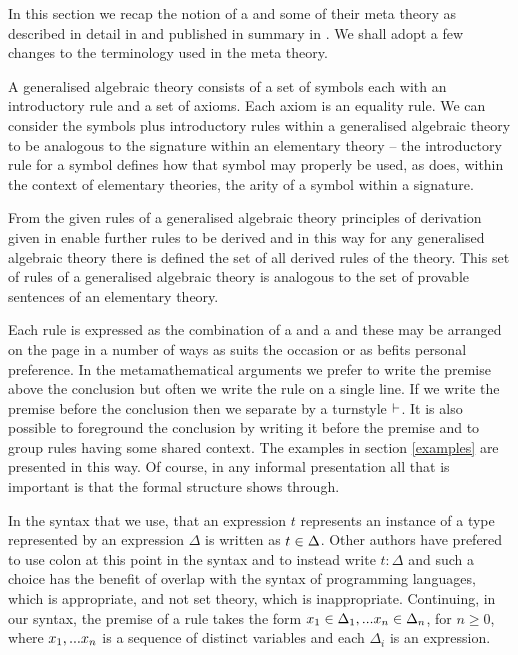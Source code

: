\label{generalisedalgrbraictheories}


In this section we recap the notion of a  and some of their meta theory 
as described in detail in \cite{Cartmell78}  and published in summary in \cite{Cartmell86}.
We shall adopt a few changes to the  terminology used in the meta theory.


A generalised algebraic theory consists of a set of symbols each with an introductory rule and a set of axioms. 
Each axiom is an equality rule. We can consider the symbols plus introductory rules within a generalised algebraic theory to be analogous to the signature within an elementary theory --
the introductory rule for a symbol defines how that symbol may properly be used, as does, within the context of elementary theories, the arity of a symbol within a signature.


From the given rules of a generalised algebraic theory  principles of derivation given in \cite{Cartmell86} enable further rules
to be derived and in this way for any generalised algebraic theory there is defined the set of all derived rules of the theory. 
This set of rules of a generalised algebraic theory is analogous to the set of provable sentences of an elementary theory.
  
Each rule is expressed as the combination of a   and a  and these may be arranged on the page in a number of ways as suits
the occasion or as befits personal preference. In the metamathematical arguments we prefer to write the premise above the conclusion 
 but often we write the rule on a single line. If we write the premise before the conclusion then we separate by a turnstyle $\vdash$. It is also possible to foreground the conclusion by writing it before the premise and to group rules having some shared context. The 
examples in section \ref{examples} are presented in this way.
Of course, in any informal presentation all that is important is that the formal structure shows through.  

In the syntax that we use,  that an expression $t$ represents an instance of a type represented by an expression $\Delta$ is written as $t \in \Delta$. Other authors have prefered to use colon at this point in the syntax  and to instead write $t:\Delta$ and such a choice has the benefit of overlap with the syntax
of programming languages, which is appropriate, and not set theory, which is inappropriate. Continuing, in our syntax,
the premise of a rule  takes the form $x_1 \in \Delta_1,... x_{n} \in \Delta_{n}$, for $n \geq 0$, where $x_1,...x_n$ is a sequence of distinct variables and each $\Delta_i$ is an expression.


